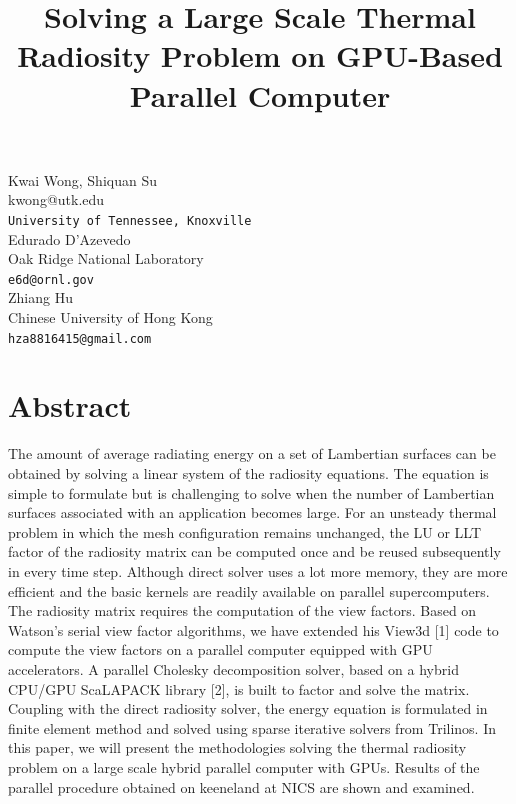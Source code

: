 \documentclass[article,A4,11pt]{llncs}%
\begin{document}
\title{Solving a Large Scale Thermal Radiosity Problem on GPU-Based Parallel Computer}
 \author{} \institute{}
\maketitle
\begin{center}
{\large Kwai Wong, Shiquan  Su}\\
kwong@utk.edu\\
{\tt University of Tennessee, Knoxville}
\\ \vspace{4mm}
{\large Edurado  D'Azevedo}\\
Oak Ridge National Laboratory\\
{\tt e6d@ornl.gov}
\\ \vspace{4mm}
{\large Zhiang Hu}\\
Chinese University of Hong Kong\\
{\tt hza8816415@gmail.com}
\end{center}

\section*{Abstract}
The amount of average radiating energy on a set of Lambertian surfaces can be obtained by solving a linear system of the radiosity equations. The equation is simple to formulate but is challenging to solve when the number of Lambertian surfaces associated with an application becomes large. For an unsteady thermal problem in which the mesh configuration remains unchanged, the LU or LLT factor of the radiosity matrix can be computed once and be reused subsequently in every time step. Although direct solver uses a lot more memory, they are more efficient and the basic kernels are readily available on parallel supercomputers.
The radiosity matrix requires the computation of the view factors. Based on Watson’s serial view factor algorithms, we have extended his View3d [1] code to compute the view factors on a parallel computer equipped with GPU accelerators. A parallel Cholesky decomposition solver, based on a hybrid CPU/GPU ScaLAPACK library [2], is built to factor and solve the matrix. Coupling with the direct radiosity solver, the energy equation is formulated in finite element method and solved using sparse iterative solvers from Trilinos. In this paper, we will present the methodologies solving the thermal radiosity problem on a large scale hybrid parallel computer with GPUs. Results of the parallel procedure obtained on keeneland at NICS are shown and examined.
\end{document}
